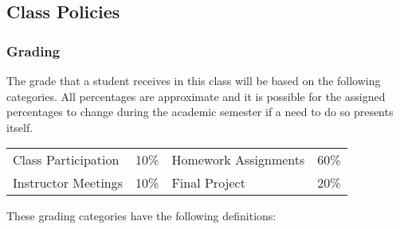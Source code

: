 \subsection*{Class Policies}

\subsubsection*{Grading}

The grade that a student receives in this class will be based on the
following categories. All percentages are approximate and it is possible
for the assigned percentages to change during the academic semester if a
need to do so presents itself. 

\begin{center}
\begin{tabular}{llll}
Class Participation & 10\% & Homework Assignments & 60\% \\
Instructor Meetings & 10\% & Final Project & 20\%
\end{tabular}
\end{center}

\vspace*{-.1in}
\noindent
These grading categories have the following definitions:
\vspace*{-.1in}


